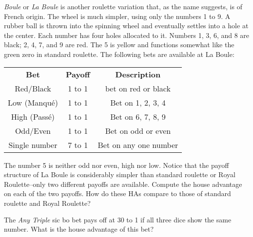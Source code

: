 \documentclass[12pt,letterpaper]{hmcpset}
\begin{document}
\begin{problem}[Bollman 5.10]
  \textit{Boule} or \textit{La Boule} is another roulette variation that, as the name suggests, is of French origin.
  The wheel is much simpler, using only the numbers 1 to 9.
  A rubber ball is thrown into the spinning wheel and eventually settles into a hole at the center.
  Each number has four holes allocated to it.
  Numbers 1, 3, 6, and 8 are black; 2, 4, 7, and 9 are red.
  The 5 is yellow and functions somewhat like the green zero in standard roulette.
  The following bets are available at La Boule:
  \begin{center}
    \begin{tabular}{ccc}
      \textbf{Bet} & \textbf{Payoff} & \textbf{Description} \\
      Red/Black    & 1 to 1 & bet on red or black \\
      Low (Manqué) & 1 to 1 & Bet on 1, 2, 3, 4 \\
      High (Passé) & 1 to 1 & Bet on 6, 7, 8, 9 \\
      Odd/Even & 1 to 1 & Bet on odd or even \\
      Single number & 7 to 1 & Bet on any one number
    \end{tabular}
  \end{center}
  The number 5 is neither odd nor even, high nor low.
  Notice that the payoff structure of La Boule is considerably simpler than standard roulette or Royal Roulette–only two different payoffs are available.
  Compute the house advantage on each of the two payoffs.
  How do these HAs compare to those of standard roulette and Royal Roulette?
\end{problem}
\begin{solution}

\end{solution}
\pagebreak
\begin{problem}[Bollman 5.14]
  The \textit{Any Triple} sic bo bet pays off at 30 to 1 if all three dice show the same number. What is the house advantage of this bet?
\end{problem}
\begin{solution}

\end{solution}
\pagebreak
\end{document}
